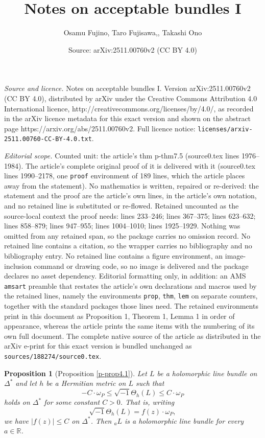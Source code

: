 \documentclass[10pt,a4paper]{amsart}
\title{Notes on acceptable bundles I}
\author{Osamu Fujino, Taro Fujisawa,, Takashi Ono}
\date{Source: arXiv:2511.00760v2 (CC BY 4.0)}
\newtheorem{prop}{Proposition}
\begin{document}
\maketitle

\noindent\emph{Source and licence.} Notes on acceptable bundles I. Version arXiv:2511.00760v2 (CC BY 4.0), distributed by arXiv under the Creative Commons Attribution 4.0 International licence, http://creativecommons.org/licenses/by/4.0/, as recorded in the arXiv licence metadata for this exact version and shown on the abstract page https://arxiv.org/abs/2511.00760v2. Full licence notice: \texttt{licenses/arxiv-2511.00760-CC-BY-4.0.txt}.\par\smallskip

\noindent\textit{Editorial scope.} Counted unit: the article's thm p-thm7.5 (source0.tex lines 1976--1984). The article's complete original proof of it is delivered with it (source0.tex lines 1990--2178, one \texttt{proof} environment of 189 lines, which the article places away from the statement). No mathematics is written, repaired or re-derived: the statement and the proof are the article's own lines, in the article's own notation, and no retained line is substituted or re-flowed.  Retained uncounted as the source-local context the proof needs: lines 233--246; lines 367--375; lines 623--632; lines 858--879; lines 947--955; lines 1004--1010; lines 1925--1929.  Nothing was omitted from any retained span, so the package carries no omission record.  No retained line contains a citation, so the wrapper carries no bibliography and no bibliography entry.  No retained line contains a figure environment, an image-inclusion command or drawing code, so no image is delivered and the package declares no asset dependency.  Editorial formatting only, in addition: an AMS \texttt{amsart} preamble that restates the article's own declarations and macros used by the retained lines, namely the environments \texttt{prop}, \texttt{thm}, \texttt{lem} on separate counters, together with the standard packages those lines need.  The retained environments print in this document as Proposition 1, Theorem 1, Lemma 1 in order of appearance, whereas the article prints the same items with the numbering of its own full document.  The complete native source of the article as distributed in the arXiv e-print for this exact version is bundled unchanged as \texttt{sources/188274/source0.tex}.
\begin{prop}[Proposition \ref{p-prop4.1}]\label{p-prop1.5} 
Let $L$ be a holomorphic line bundle 
on $\Delta^*$ and let $h$ be a Hermitian metric on $L$ such that
\[
-C \cdot \omega_P \leq \sqrt{-1} \Theta_h(L) \leq C \cdot \omega_P
\]
holds on $\Delta^*$ for some constant $C > 0$.
That is, writing
\[
\sqrt{-1} \Theta_h(L) = f(z) \cdot \omega_P,
\]
we have $|f(z)| \leq C$ on $\Delta^*$. 
Then ${}_a L$ is a holomorphic line bundle for every $a \in \mathbb{R}$.
\end{prop}
\end{document}
